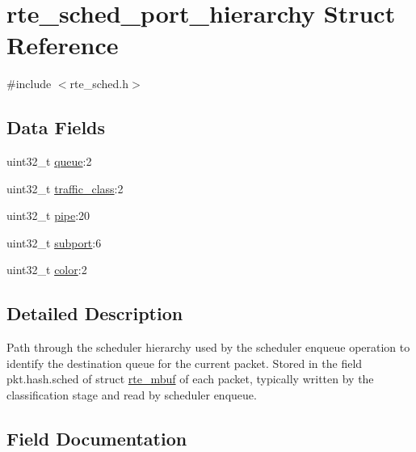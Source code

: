 \hypertarget{structrte__sched__port__hierarchy}{}\section{rte\+\_\+sched\+\_\+port\+\_\+hierarchy Struct Reference}
\label{structrte__sched__port__hierarchy}


{\ttfamily \#include $<$rte\+\_\+sched.\+h$>$}

\subsection*{Data Fields}
\begin{DoxyCompactItemize}
\item 
uint32\+\_\+t \hyperlink{structrte__sched__port__hierarchy_a2b1b322d05920512d14aa65fc6055207}{queue}\+:2
\item 
uint32\+\_\+t \hyperlink{structrte__sched__port__hierarchy_a3a5f512c3cff981dd7ded965bd3a7530}{traffic\+\_\+class}\+:2
\item 
uint32\+\_\+t \hyperlink{structrte__sched__port__hierarchy_aab9d6c721df5d1e7f16a62775d4b8a27}{pipe}\+:20
\item 
uint32\+\_\+t \hyperlink{structrte__sched__port__hierarchy_a33315241553c200d0c73b47c82a84313}{subport}\+:6
\item 
uint32\+\_\+t \hyperlink{structrte__sched__port__hierarchy_a66b2ef8398a8bbb0f5816f22a7b138da}{color}\+:2
\end{DoxyCompactItemize}


\subsection{Detailed Description}
Path through the scheduler hierarchy used by the scheduler enqueue operation to identify the destination queue for the current packet. Stored in the field pkt.\+hash.\+sched of struct \hyperlink{structrte__mbuf}{rte\+\_\+mbuf} of each packet, typically written by the classification stage and read by scheduler enqueue. 

\subsection{Field Documentation}
\hypertarget{structrte__sched__port__hierarchy_a66b2ef8398a8bbb0f5816f22a7b138da}{}

